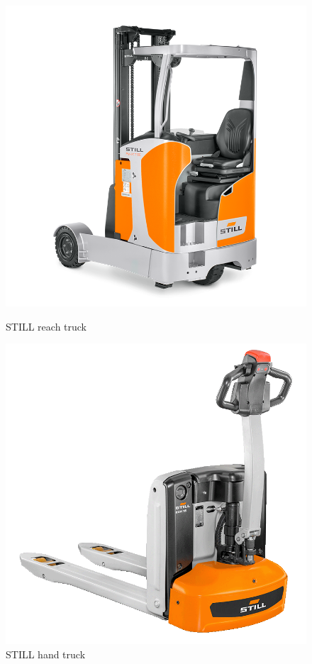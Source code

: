\begin{figure}[h!]
    \centering
    \begin{minipage}{0.45\textwidth}
        \centering
        \includegraphics[width=\linewidth]{images/Chap0/Reach trucks.png} %
        \caption{STILL reach truck}
        \label{Reach trucks}
    \end{minipage}
    \begin{minipage}{0.45\textwidth}
        \centering
        \includegraphics[width=\linewidth]{images/Chap0/hand truck.png} %
        \caption{STILL hand truck}
        \label{hand truck}
    \end{minipage}
\end{figure}

